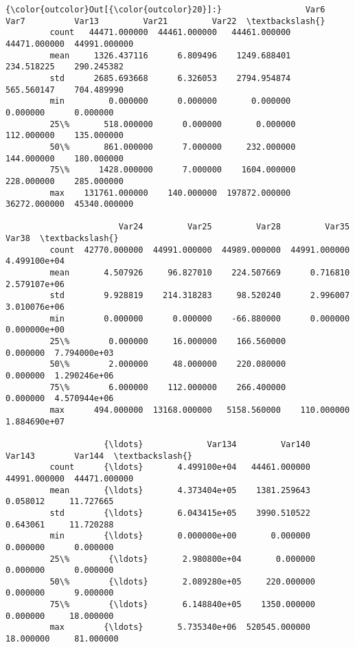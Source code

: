 \documentclass[11pt]{article}
\begin{document}
\begin{Verbatim}[commandchars=\\\{\}]
{\color{outcolor}Out[{\color{outcolor}20}]:}                 Var6          Var7          Var13         Var21         Var22  \textbackslash{}
         count   44471.000000  44461.000000   44461.000000  44471.000000  44991.000000   
         mean     1326.437116      6.809496    1249.688401    234.518225    290.245382   
         std      2685.693668      6.326053    2794.954874    565.560147    704.489990   
         min         0.000000      0.000000       0.000000      0.000000      0.000000   
         25\%       518.000000      0.000000       0.000000    112.000000    135.000000   
         50\%       861.000000      7.000000     232.000000    144.000000    180.000000   
         75\%      1428.000000      7.000000    1604.000000    228.000000    285.000000   
         max    131761.000000    140.000000  197872.000000  36272.000000  45340.000000   
         
                       Var24         Var25         Var28         Var35         Var38  \textbackslash{}
         count  42770.000000  44991.000000  44989.000000  44991.000000  4.499100e+04   
         mean       4.507926     96.827010    224.507669      0.716810  2.579107e+06   
         std        9.928819    214.318283     98.520240      2.996007  3.010076e+06   
         min        0.000000      0.000000    -66.880000      0.000000  0.000000e+00   
         25\%        0.000000     16.000000    166.560000      0.000000  7.794000e+03   
         50\%        2.000000     48.000000    220.080000      0.000000  1.290246e+06   
         75\%        6.000000    112.000000    266.400000      0.000000  4.570944e+06   
         max      494.000000  13168.000000   5158.560000    110.000000  1.884690e+07   
         
                    {\ldots}             Var134         Var140        Var143        Var144  \textbackslash{}
         count      {\ldots}       4.499100e+04   44461.000000  44991.000000  44471.000000   
         mean       {\ldots}       4.373404e+05    1381.259643      0.058012     11.727665   
         std        {\ldots}       6.043415e+05    3990.510522      0.643061     11.720288   
         min        {\ldots}       0.000000e+00       0.000000      0.000000      0.000000   
         25\%        {\ldots}       2.980800e+04       0.000000      0.000000      0.000000   
         50\%        {\ldots}       2.089280e+05     220.000000      0.000000      9.000000   
         75\%        {\ldots}       6.148840e+05    1350.000000      0.000000     18.000000   
         max        {\ldots}       5.735340e+06  520545.000000     18.000000     81.000000   
         

\end{Verbatim}
\end{document}
